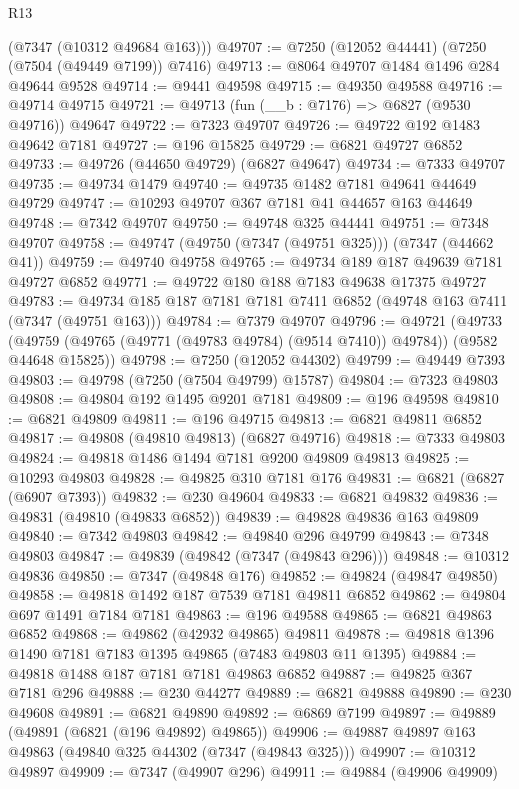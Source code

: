 \begin{lexlean}{R13}
\begin{coremodule}
      (@7347 (@10312 @49684 @163)))
@49707 := @7250 (@12052 @44441) (@7250 (@7504 (@49449 @7199)) @7416)
@49713 := @8064 @49707 @1484 @1496 @284 @49644 @9528
@49714 := @9441 @49598
@49715 := @49350 @49588
@49716 := @49714 @49715
@49721 := @49713 (fun (__b : @7176) => @6827 (@9530 @49716)) @49647
@49722 := @7323 @49707
@49726 := @49722 @192 @1483 @49642 @7181
@49727 := @196 @15825
@49729 := @6821 @49727 @6852
@49733 := @49726 (@44650 @49729) (@6827 @49647)
@49734 := @7333 @49707
@49735 := @49734 @1479
@49740 := @49735 @1482 @7181 @49641 @44649 @49729
@49747 := @10293 @49707 @367 @7181 @41 @44657 @163 @44649
@49748 := @7342 @49707
@49750 := @49748 @325 @44441
@49751 := @7348 @49707
@49758 := @49747 (@49750 (@7347 (@49751 @325))) (@7347 (@44662 @41))
@49759 := @49740 @49758
@49765 := @49734 @189 @187 @49639 @7181 @49727 @6852
@49771 := @49722 @180 @188 @7183 @49638 @17375 @49727
@49783 := @49734 @185 @187 @7181 @7181 @7411 @6852 (@49748 @163 @7411 (@7347 (@49751 @163)))
@49784 := @7379 @49707
@49796 := @49721
    (@49733 (@49759 (@49765 (@49771 (@49783 @49784) (@9514 @7410)) @49784)) (@9582 @44648 @15825))
@49798 := @7250 (@12052 @44302)
@49799 := @49449 @7393
@49803 := @49798 (@7250 (@7504 @49799) @15787)
@49804 := @7323 @49803
@49808 := @49804 @192 @1495 @9201 @7181
@49809 := @196 @49598
@49810 := @6821 @49809
@49811 := @196 @49715
@49813 := @6821 @49811 @6852
@49817 := @49808 (@49810 @49813) (@6827 @49716)
@49818 := @7333 @49803
@49824 := @49818 @1486 @1494 @7181 @9200 @49809 @49813
@49825 := @10293 @49803
@49828 := @49825 @310 @7181 @176
@49831 := @6821 (@6827 (@6907 @7393))
@49832 := @230 @49604
@49833 := @6821 @49832
@49836 := @49831 (@49810 (@49833 @6852))
@49839 := @49828 @49836 @163 @49809
@49840 := @7342 @49803
@49842 := @49840 @296 @49799
@49843 := @7348 @49803
@49847 := @49839 (@49842 (@7347 (@49843 @296)))
@49848 := @10312 @49836
@49850 := @7347 (@49848 @176)
@49852 := @49824 (@49847 @49850)
@49858 := @49818 @1492 @187 @7539 @7181 @49811 @6852
@49862 := @49804 @697 @1491 @7184 @7181
@49863 := @196 @49588
@49865 := @6821 @49863 @6852
@49868 := @49862 (@42932 @49865) @49811
@49878 := @49818 @1396 @1490 @7181 @7183 @1395 @49865 (@7483 @49803 @11 @1395)
@49884 := @49818 @1488 @187 @7181 @7181 @49863 @6852
@49887 := @49825 @367 @7181 @296
@49888 := @230 @44277
@49889 := @6821 @49888
@49890 := @230 @49608
@49891 := @6821 @49890
@49892 := @6869 @7199
@49897 := @49889 (@49891 (@6821 (@196 @49892) @49865))
@49906 := @49887 @49897 @163 @49863 (@49840 @325 @44302 (@7347 (@49843 @325)))
@49907 := @10312 @49897
@49909 := @7347 (@49907 @296)
@49911 := @49884 (@49906 @49909)

\end{coremodule}
\end{lexlean}
